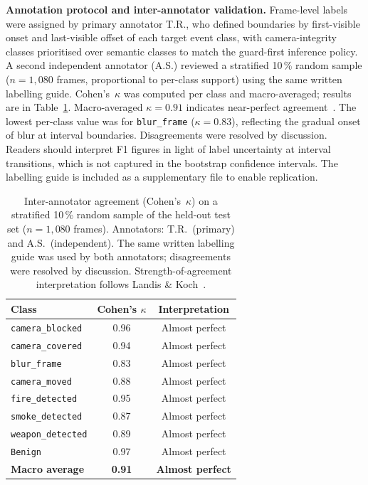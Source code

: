 \documentclass[sensors,article,submit,pdftex,moreauthors]{Definitions/mdpi}
\begin{document}
\textbf{Annotation protocol and inter-annotator validation.}
Frame-level labels were assigned by primary annotator T.R., who defined boundaries by first-visible onset and last-visible offset of each target event class, with camera-integrity classes prioritised over semantic classes to match the guard-first inference policy. A second independent annotator (A.S.) reviewed a stratified 10\,\% random sample ($n=1{,}080$ frames, proportional to per-class support) using the same written labelling guide. Cohen's~$\kappa$ was computed per class and macro-averaged; results are in Table~\ref{tab:interrater}. Macro-averaged $\kappa = 0.91$ indicates near-perfect agreement~\cite{landis1977measurement}. The lowest per-class value was for \texttt{blur\_frame} ($\kappa = 0.83$), reflecting the gradual onset of blur at interval boundaries. Disagreements were resolved by discussion. Readers should interpret F1 figures in light of label uncertainty at interval transitions, which is not captured in the bootstrap confidence intervals. The labelling guide is included as a supplementary file to enable replication.
 
\begin{table}[H]
\caption{Inter-annotator agreement (Cohen's~$\kappa$) on a stratified
10\,\% random sample of the held-out test set ($n=1{,}080$ frames).
Annotators: T.R.\ (primary) and A.S.\ (independent). The same written
labelling guide was used by both annotators; disagreements were resolved
by discussion. Strength-of-agreement interpretation follows
Landis \& Koch~\cite{landis1977measurement}.}
\label{tab:interrater}
\centering\small\setlength{\tabcolsep}{6pt}
\begin{tabular}{lcc}
\toprule
\textbf{Class} & \textbf{Cohen's $\kappa$} & \textbf{Interpretation} \\
\midrule
\texttt{camera\_blocked}  & 0.96 & Almost perfect \\
\texttt{camera\_covered}  & 0.94 & Almost perfect \\
\texttt{blur\_frame}      & 0.83 & Almost perfect \\
\texttt{camera\_moved}    & 0.88 & Almost perfect \\
\texttt{fire\_detected}   & 0.95 & Almost perfect \\
\texttt{smoke\_detected}  & 0.87 & Almost perfect \\
\texttt{weapon\_detected} & 0.89 & Almost perfect \\
\texttt{Benign}           & 0.97 & Almost perfect \\
\midrule
\textbf{Macro average}    & \textbf{0.91} & \textbf{Almost perfect} \\
\bottomrule
\end{tabular}
\end{table}
 
\end{document}
